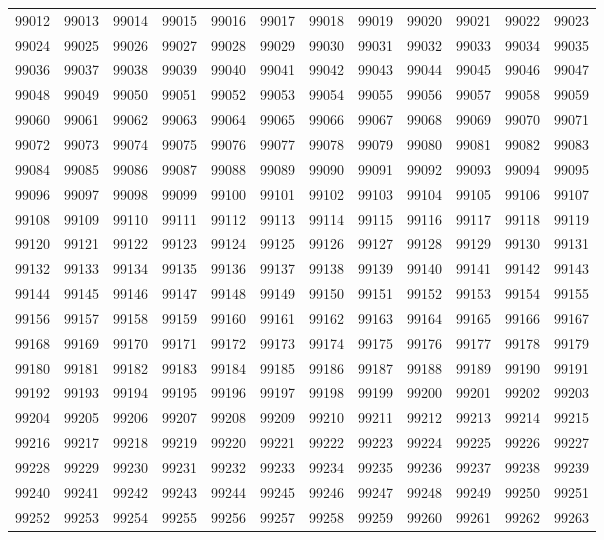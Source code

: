 \begin{center}
\begin{longtable}{llllllllllll}
99012 &99013 &99014 &99015 &99016 &99017 &99018 &99019 &99020 &99021 &99022 &99023 \\
99024 &99025 &99026 &99027 &99028 &99029 &99030 &99031 &99032 &99033 &99034 &99035 \\
99036 &99037 &99038 &99039 &99040 &99041 &99042 &99043 &99044 &99045 &99046 &99047 \\
99048 &99049 &99050 &99051 &99052 &99053 &99054 &99055 &99056 &99057 &99058 &99059 \\
99060 &99061 &99062 &99063 &99064 &99065 &99066 &99067 &99068 &99069 &99070 &99071 \\
99072 &99073 &99074 &99075 &99076 &99077 &99078 &99079 &99080 &99081 &99082 &99083 \\
99084 &99085 &99086 &99087 &99088 &99089 &99090 &99091 &99092 &99093 &99094 &99095 \\
99096 &99097 &99098 &99099 &99100 &99101 &99102 &99103 &99104 &99105 &99106 &99107 \\
99108 &99109 &99110 &99111 &99112 &99113 &99114 &99115 &99116 &99117 &99118 &99119 \\
99120 &99121 &99122 &99123 &99124 &99125 &99126 &99127 &99128 &99129 &99130 &99131 \\
99132 &99133 &99134 &99135 &99136 &99137 &99138 &99139 &99140 &99141 &99142 &99143 \\
99144 &99145 &99146 &99147 &99148 &99149 &99150 &99151 &99152 &99153 &99154 &99155 \\
99156 &99157 &99158 &99159 &99160 &99161 &99162 &99163 &99164 &99165 &99166 &99167 \\
99168 &99169 &99170 &99171 &99172 &99173 &99174 &99175 &99176 &99177 &99178 &99179 \\
99180 &99181 &99182 &99183 &99184 &99185 &99186 &99187 &99188 &99189 &99190 &99191 \\
99192 &99193 &99194 &99195 &99196 &99197 &99198 &99199 &99200 &99201 &99202 &99203 \\
99204 &99205 &99206 &99207 &99208 &99209 &99210 &99211 &99212 &99213 &99214 &99215 \\
99216 &99217 &99218 &99219 &99220 &99221 &99222 &99223 &99224 &99225 &99226 &99227 \\
99228 &99229 &99230 &99231 &99232 &99233 &99234 &99235 &99236 &99237 &99238 &99239 \\
99240 &99241 &99242 &99243 &99244 &99245 &99246 &99247 &99248 &99249 &99250 &99251 \\
99252 &99253 &99254 &99255 &99256 &99257 &99258 &99259 &99260 &99261 &99262 &99263 \\

\end{longtable}
\end{center}
